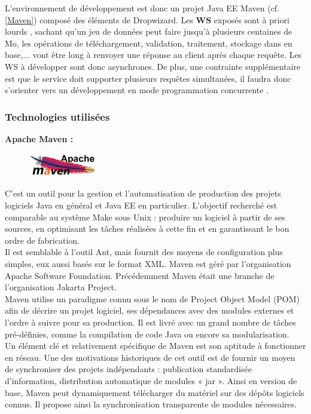 \begin{itemize}
L'environnement de développement est donc un projet Java EE Maven (cf. \ref{Maven}) composé des éléments de Dropwizard. 
Les \textbf{WS} exposés sont à priori \og lourds \fg, sachant qu'un jeu de données peut faire jusqu'à plusieurs centaines de Mo, les opérations de téléchargement, validation, traitement, stockage dans en base,... vont être long à renvoyer une réponse au client après chaque requête. Les WS à développer sont donc asynchrones. De plus, une contrainte supplémentaire est que le service doit supporter plusieurs requêtes simultanées, il faudra donc s'orienter vers un développement en mode \og programmation concurrente \fg.\\

\subsubsection{Technologies utilisées}\label{MobiSAASTechno}

\textbf{Apache Maven : } \label{Maven}

\begin{figure}
\centering
\includegraphics[width=3cm]{images/apacheMaven.jpg}
\end{figure}
\noindent C'est un outil pour la gestion et l'automatisation de production des projets logiciels Java en général et Java EE en particulier. L'objectif recherché est comparable au système Make sous Unix : produire un logiciel à partir de ses sources, en optimisant les tâches réalisées à cette fin et en garantissant le bon ordre de fabrication.\\
Il est semblable à l'outil Ant, mais fournit des moyens de configuration plus simples, eux aussi basés sur le format XML. Maven est géré par l'organisation Apache Software Foundation. Précédemment Maven était une branche de l'organisation Jakarta Project.\\
Maven utilise un paradigme connu sous le nom de Project Object Model (POM) afin de décrire un projet logiciel, ses dépendances avec des modules externes et l'ordre à suivre pour sa production. Il est livré avec un grand nombre de tâches pré-définies, comme la compilation de code Java ou encore sa modularisation.\\
Un élément clé et relativement spécifique de Maven est son aptitude à fonctionner en réseau. Une des motivations historiques de cet outil est de fournir un moyen de synchroniser des projets indépendants : publication standardisée d'information, distribution automatique de modules « jar ». Ainsi en version de base, Maven peut dynamiquement télécharger du matériel sur des dépôts logiciels connus. Il propose ainsi la synchronisation transparente de modules nécessaires.\\


\end{itemize}
